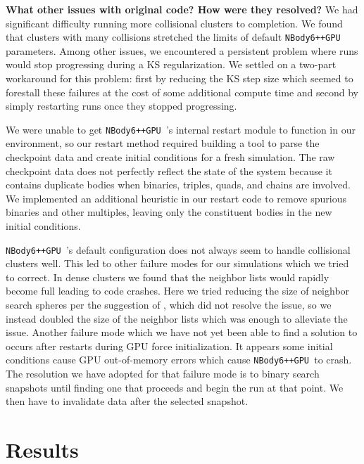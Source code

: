 \documentclass[preprint1]{aastex}
\newcommand\nbody{\texttt{NBody6++GPU }}
\numberwithin{equation}{section}
\begin{document}
\textbf{What other issues with original code?  How were they resolved?}
We had significant difficulty running more collisional clusters to completion.  We found that clusters with many collisions stretched the limits of default \nbody parameters.  Among other issues, we encountered a persistent problem where runs would stop progressing during a KS regularization.  We settled on a two-part workaround for this problem: first by reducing the KS step size which seemed to forestall these failures at the cost of some additional compute time and second by simply restarting runs once they stopped progressing. 

We were unable to get \nbody's internal restart module to function in our environment, so our restart method required building a tool to parse the checkpoint data and create initial conditions for a fresh simulation.  The raw checkpoint data does not perfectly reflect the state of the system because it contains duplicate bodies when binaries, triples, quads, and chains are involved. We implemented an additional heuristic in our restart code to remove spurious binaries and other multiples, leaving only the constituent bodies in the new initial conditions.

\nbody's default configuration does not always seem to handle collisional clusters well. This led to other failure modes for our simulations which we tried to correct. In dense clusters we found that the neighbor lists would rapidly become full leading to code crashes.  Here we tried reducing the size of neighbor search spheres per the suggestion of \citet[][personal communication]{2017Wang}, which did not resolve the issue, so we instead doubled the size of the neighbor lists which was enough to alleviate the issue. Another failure mode which we have not yet been able to find a solution to occurs after restarts during GPU force initialization. It appears some initial conditions cause GPU out-of-memory errors which cause \nbody to crash. The resolution we have adopted for that failure mode is to binary search snapshots until finding one that proceeds and begin the run at that point.  We then have to invalidate data after the selected snapshot.

\section{Results} \label{Results}
\end{document}
